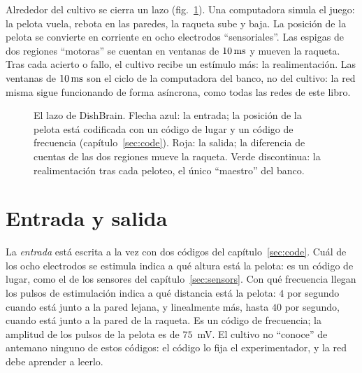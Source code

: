 Alrededor del cultivo se cierra un lazo (fig.~\ref{fig:dishloop}). Una computadora simula el juego: la pelota vuela, rebota en las paredes, la raqueta sube y baja. La posición de la pelota se convierte en corriente en ocho electrodos “sensoriales”. Las espigas de dos regiones “motoras” se cuentan en ventanas de $10\,\text{ms}$ y mueven la raqueta. Tras cada acierto o fallo, el cultivo recibe un estímulo más: la realimentación. Las ventanas de $10\,\text{ms}$ son el ciclo de la computadora del banco, no del cultivo: la red misma sigue funcionando de forma asíncrona, como todas las redes de este libro.

\begin{figure}[t]
\centering
{}
\caption{El lazo de DishBrain. Flecha azul: la entrada; la posición de la pelota está codificada con un código de lugar y un código de frecuencia (capítulo~\ref{sec:code}). Roja: la salida; la diferencia de cuentas de las dos regiones mueve la raqueta. Verde discontinua: la realimentación tras cada peloteo, el único “maestro” del banco.}
\label{fig:dishloop}
\end{figure}

\section{Entrada y salida}

La \emph{entrada} está escrita a la vez con dos códigos del capítulo~\ref{sec:code}. Cuál de los ocho electrodos se estimula indica a qué altura está la pelota: es un código de lugar, como el de los sensores del capítulo~\ref{sec:sensors}. Con qué frecuencia llegan los pulsos de estimulación indica a qué distancia está la pelota: $4$ por segundo cuando está junto a la pared lejana, y linealmente más, hasta $40$ por segundo, cuando está junto a la pared de la raqueta. Es un código de frecuencia; la amplitud de los pulsos de la pelota es de $75$~mV. El cultivo no “conoce” de antemano ninguno de estos códigos: el código lo fija el experimentador, y la red debe aprender a leerlo.

